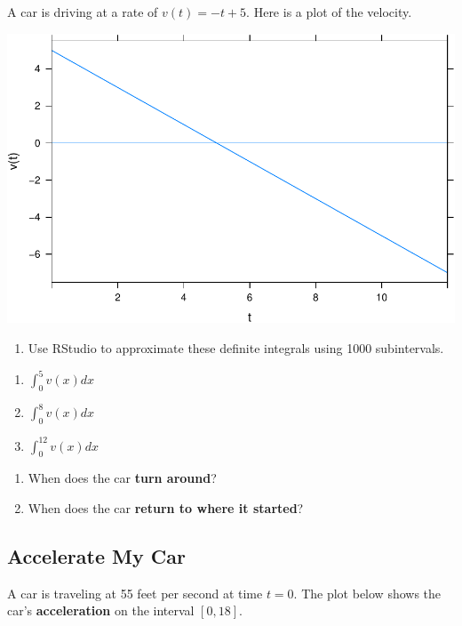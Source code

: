 \documentclass[
]{book}
\providecommand{\tightlist}{%
  \setlength{\itemsep}{0pt}\setlength{\parskip}{0pt}}
\begin{document}
A car is driving at a rate of \(v(t)=-t+5\). Here is a plot of the velocity.

\includegraphics{_bookdown_files/math135_handbook_files/figure-latex/unnamed-chunk-133-1.pdf}

\begin{enumerate}
\def\labelenumi{\arabic{enumi}.}
\tightlist
\item
  Use RStudio to approximate these definite integrals using 1000 subintervals.
\end{enumerate}

\begin{enumerate}
\def\labelenumi{\alph{enumi}.}
\tightlist
\item
  \(\displaystyle{\int_0^5 v(x)dx}\)
\item
  \(\displaystyle{\int_0^8 v(x)dx}\)
\item
  \(\displaystyle{\int_0^{12} v(x)dx}\)
\end{enumerate}

\begin{enumerate}
\def\labelenumi{\arabic{enumi}.}
\setcounter{enumi}{1}
\item
  When does the car \textbf{turn around}?
\item
  When does the car \textbf{return to where it started}?
\end{enumerate}

\hypertarget{accelerate-my-car}{%
\subsection{Accelerate My Car}\label{accelerate-my-car}}

A car is traveling at 55 feet per second at time \(t=0\). The plot below shows the car's \textbf{acceleration} on the interval \([0,18]\).
\end{document}
